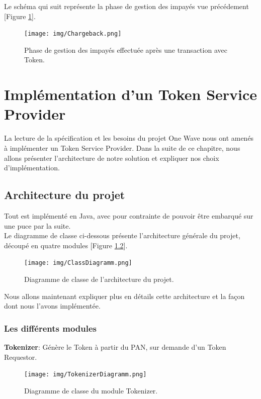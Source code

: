 \documentclass{report}
\begin{document}
\noindent
Le schéma qui suit représente la phase de gestion des impayés vue précédement [Figure \ref{Impayes}].

\begin{figure}[!ht]
    \centering
			\texttt{[image: img/Chargeback.png]}
			\caption{\label{Impayes} Phase de gestion des impayés effectuée après une transaction avec Token.}			
\end{figure}



\chapter{Implémentation d'un Token Service Provider}
La lecture de la spécification et les besoins du projet One Wave nous ont amenés à implémenter un Token Service Provider. Dans la suite de ce chapitre, nous allons présenter l'architecture de notre solution et expliquer nos choix d'implémentation.

\section{Architecture du projet}
Tout est implémenté en Java, avec pour contrainte de pouvoir être embarqué sur une puce par la suite.\\
Le diagramme de classe ci-dessous présente l'architecture générale du projet, découpé en quatre modules [Figure \ref{Architecture}].

\begin{figure}[!ht]
    \centering
			\texttt{[image: img/ClassDiagramm.png]}
			\caption{\label{Architecture} Diagramme de classe de l'architecture du projet.}			
\end{figure}

\noindent
Nous allons maintenant expliquer plus en détails cette architecture et la façon dont nous l'avons implémentée.

\newpage
\subsection{Les différents modules}
\noindent
\textbf{Tokenizer}: Génère le Token à partir du PAN, sur demande d'un Token Requestor.

\begin{figure}[!ht]
    \centering
			\texttt{[image: img/TokenizerDiagramm.png]}
			\caption{\label{Architecture} Diagramme de classe du module Tokenizer.}			
\end{figure}
\end{document}
